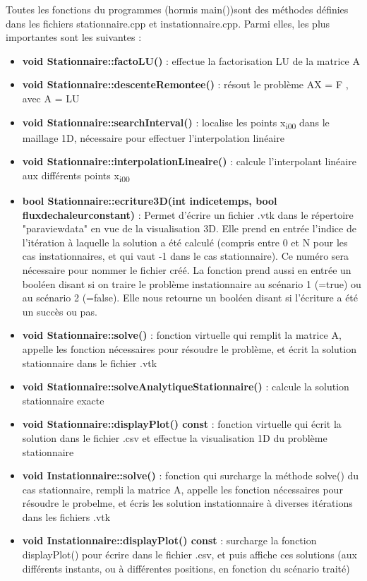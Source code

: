\documentclass[11pt]{article} %
\begin{document}
Toutes les fonctions du programmes (hormis main())sont des méthodes définies dans les fichiers stationnaire.cpp et instationnaire.cpp. Parmi elles, les plus importantes sont les suivantes :
\begin{itemize}
	\item\textbf{void Stationnaire::factoLU() }: effectue la factorisation LU de la matrice A
	\item\textbf{void Stationnaire::descenteRemontee() }: résout le problème AX = F , avec A = LU
	\item\textbf{void Stationnaire::searchInterval() }: localise les points x\textsubscript{i00} dans le maillage 1D, nécessaire pour effectuer l’interpolation linéaire
	\item\textbf{void Stationnaire::interpolationLineaire() }: calcule l’interpolant linéaire aux différents points x\textsubscript{i00}
	\item\textbf{bool Stationnaire::ecriture3D(int indice\textunderscore temps, bool flux\textunderscore de\textunderscore chaleur\textunderscore constant) }: Permet d’écrire un fichier .vtk dans le répertoire "paraview\textunderscore data" en vue de la visualisation 3D. Elle prend en entrée l’indice de l’itération à laquelle la solution a été calculé (compris entre 0 et N pour les cas instationnaires, et qui vaut -1 dans le cas stationnaire). Ce numéro sera nécessaire pour nommer le fichier créé. La fonction prend aussi en entrée un booléen disant si on traire le problème instationnaire au scénario 1 (=true) ou au scénario 2 (=false). Elle nous retourne un booléen disant si l’écriture a été un succès ou pas.
	\item\textbf{void Stationnaire::solve() }: fonction virtuelle qui remplit la matrice A, appelle les fonction nécessaires pour résoudre le problème, et écrit la solution stationnaire dans le fichier .vtk
	\item\textbf{void Stationnaire::solveAnalytiqueStationnaire() }: calcule la solution stationnaire exacte
	\item\textbf{void Stationnaire::displayPlot() const }: fonction virtuelle qui écrit la solution dans le fichier .csv et effectue la visualisation 1D du problème stationnaire
	\item\textbf{void Instationnaire::solve() }: fonction qui surcharge la méthode solve() du cas stationnaire, rempli la matrice A, appelle les fonction nécessaires pour résoudre le probelme, et écris les solution instationnaire à diverses itérations dans les fichiers .vtk
	\item\textbf{void Instationnaire::displayPlot() const }: surcharge la fonction displayPlot() pour écrire dans le fichier .csv, et puis affiche ces solutions (aux différents instants, ou à différentes positions, en fonction du scénario traité)
\end{itemize}
	
\end{document}
